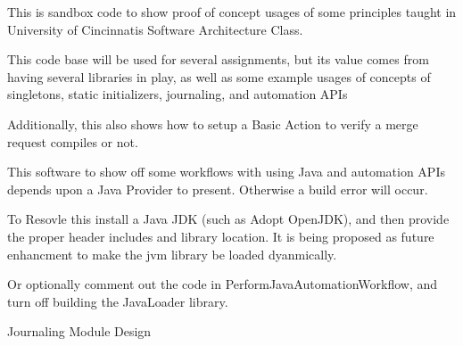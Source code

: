This is sandbox code to show proof of concept usages of some principles taught in University of Cincinnati\textquotesingle{}s Software Architecture Class.

This code base will be used for several assignments, but it\textquotesingle{}s value comes from having several libraries in play, as well as some example usages of concepts of singletons, static initializers, journaling, and automation APIs

Additionally, this also shows how to setup a Basic Action to verify a merge request compiles or not.

This software to show off some workflows with using Java and automation APIs depends upon a Java Provider to present. Otherwise a build error will occur.

To Resovle this install a Java JDK (such as Adopt Open\+JDK), and then provide the proper header includes and library location. It is being proposed as future enhancment to make the jvm library be loaded dyanmically.

Or optionally comment out the code in Perform\+Java\+Automation\+Workflow, and turn off building the Java\+Loader library.

Journaling Module Design 